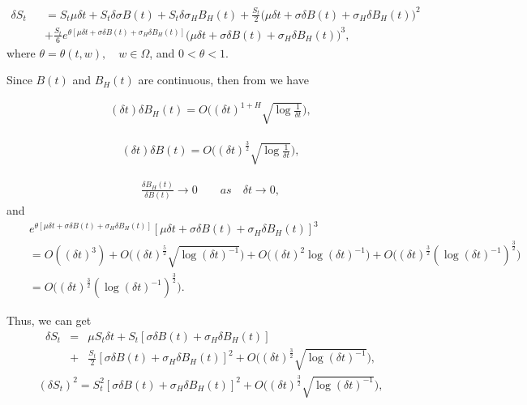 \documentclass[a4paper,11pt]{amsart}
\numberwithin{equation}{section}
\theoremstyle{definition}
\theoremstyle{plain}
\theoremstyle{definition}
\newcommand{\1}{\mathbf{1}}
\begin{document}
\begin{eqnarray}
\delta S_t&&=S_t\mu\delta t+S_t\delta \sigma B(t)+S_t\delta\sigma_H B_H(t)+\frac{S_t}{2}\big(\mu\delta t +\sigma\delta B(t)+\sigma_H\delta B_H(t)\big)^2 \nonumber \\
&&+\frac{S_t}{6}e^{\theta[\mu\delta t+\sigma\delta B(t)+\sigma_H\delta B_H(t)]}\big(\mu\delta t+\sigma\delta B(t)+\sigma_H\delta B_H(t)\big)^3,
\label{eq:a3}
\end{eqnarray}
where $\theta=\theta(t,w),\quad w\in\Omega$, and $0<\theta<1$.

Since $B(t)$ and  $B_H(t)$ are continuous, then from \cite{wang} we have

\begin{eqnarray}
(\delta t)\delta B_H(t)=O\Big((\delta t)^{1+H}\sqrt{\log \frac{1}{\delta t}}\Big),
\label{eq:a4}
\end{eqnarray}

\begin{eqnarray}
(\delta t)\delta B(t)=O\Big((\delta t)^{\frac{3}{2}}\sqrt{\log \frac{1}{\delta t}}\Big),
\label{eq:a5}
\end{eqnarray}

\begin{eqnarray}
\frac{\delta B_H(t)}{\delta B(t)}\rightarrow 0 \qquad as\quad \delta t\rightarrow 0,
\label{eq:a6}
\end{eqnarray}
and
\begin{eqnarray}
&&e^{\theta[\mu\delta t+\sigma \delta B(t)+\sigma_H\delta B_H(t)]}[\mu\delta t+\sigma \delta B(t)+\sigma_H\delta B_H(t)]^3\nonumber \\
&&=O((\delta t)^3)+O\big((\delta t)^{\frac{5}{2}}\sqrt{\log (\delta t)^{-1}}\big)+O\big((\delta t)^2\log(\delta t)^{-1}\big)+O\big((\delta t)^{\frac{3}{2}}(\log (\delta t)^{-1})^{\frac{3}{2}}\big)\nonumber \\
&&=O\big((\delta t)^{\frac{3}{2}}(\log (\delta t)^{-1})^{\frac{3}{2}}\big)\nonumber.
\label{eq:a7}
\end{eqnarray}

Thus, we can get
\begin{eqnarray}
\delta S_t&=&\mu S_t\delta t+ S_t[\sigma \delta B(t)+\sigma_H\delta B_H(t)]\nonumber \\
&+&\frac{S_t}{2}[\sigma \delta B(t)+\sigma _H \delta B_H(t)]^2+O\big((\delta t)^{\frac{3}{2}}\sqrt{\log (\delta t)^{-1}}\big),
\label{eq:a8}
\end{eqnarray}
\begin{eqnarray}
(\delta S_t)^2=S_t^2[\sigma\delta B(t)+\sigma_H\delta B_H(t)]^2+O\big((\delta t)^{\frac{3}{2}}\sqrt{\log (\delta t)^{-1}}\big),
\label{eq:a9}
\end{eqnarray}
\end{document}
